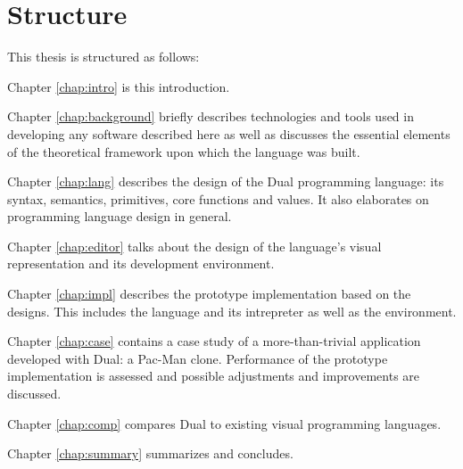\section{Structure}
This thesis is structured as follows:

Chapter \ref{chap:intro} is this introduction.

Chapter \ref{chap:background} briefly describes technologies and tools used in developing any software described here as well as discusses the essential elements of the theoretical framework upon which the language was built.

Chapter \ref{chap:lang} describes the design of the Dual programming language: its syntax, semantics, primitives, core functions and values. It also elaborates on programming language design in general.

Chapter \ref{chap:editor} talks about the design of the language's visual representation and its development environment. 

Chapter \ref{chap:impl} describes the prototype implementation based on the designs. This includes the language and its intrepreter as well as the environment.

Chapter \ref{chap:case} contains a case study of a more-than-trivial application developed with Dual: a Pac-Man clone. Performance of the prototype implementation is assessed and possible adjustments and improvements are discussed.

Chapter \ref{chap:comp} compares Dual to existing visual programming languages.

Chapter \ref{chap:summary} summarizes and concludes.
